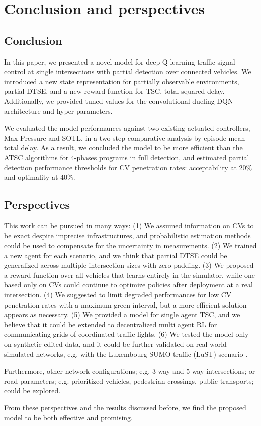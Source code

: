 \documentclass[journal]{IEEEtran}
\begin{document}
\section{Conclusion and perspectives}
\label{sec:conslusion}

\subsection{Conclusion}
In this paper, we presented a novel model for deep Q-learning traffic signal control at single intersections with partial detection over connected vehicles. We introduced a new state representation for partially observable environments, partial DTSE, and a new reward function for TSC, total squared delay. Additionally, we provided tuned values for the convolutional dueling DQN architecture and hyper-parameters.

We evaluated the model performances against two existing actuated controllers, Max Pressure and SOTL, in a two-step comparative analysis by episode mean total delay. As a result, we concluded the model to be more efficient than the ATSC algorithms for 4-phases programs in full detection, and estimated partial detection performance thresholds for CV penetration rates: acceptability at $20\%$ and optimality at $40\%$.

\subsection{Perspectives}
This work can be pursued in many ways: 
(1) We assumed information on CVs to be exact despite imprecise infrastructures, and probabilistic estimation methods could be used to compensate for the uncertainty in measurements. 
(2) We trained a new agent for each scenario, and we think that partial DTSE could be generalized across multiple intersection sizes with zero-padding. 
(3) We proposed a reward function over all vehicles that learns entirely in the simulator, while one based only on CVs could continue to optimize policies after deployment at a real intersection.
(4) We suggested to limit degraded performances for low CV penetration rates with a maximum green interval, but a more efficient solution appears as necessary. 
(5) We provided a model for single agent TSC, and we believe that it could be extended to decentralized multi agent RL for communicating grids of coordinated traffic lights.
(6) We tested the model only on synthetic edited data, and it could be further validated on real world simulated networks, e.g. with the Luxembourg SUMO traffic (LuST) scenario \cite{Codeca2015luxembourg}.

Furthermore, other network configurations; e.g. 3-way and 5-way intersections; or road parameters; e.g. prioritized vehicles, pedestrian crossings, public transports; could be explored.

From these perspectives and the results discussed before, we find the proposed model to be both effective and promising.

\printbibliography
\end{document}
